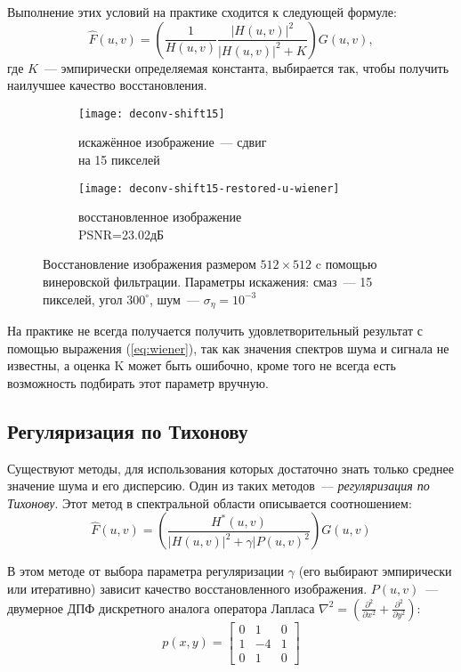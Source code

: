 Выполнение этих условий на практике сходится к следующей формуле:
\begin{equation}\label{eq:wiener}
\hat{F}(u,v)=\left(\frac{1}{H(u,v)}\frac{|H(u,v)|^2}{|H(u,v)|^2+K}\right)G(u,v),
\end{equation}
где $K$~--- эмпирически определяемая константа, выбирается так, чтобы получить наилучшее качество восстановления.

\begin{figure}[h!]
	\begin{subfigure}[b]{0.5\textwidth}
		\texttt{[image: deconv-shift15]}
		\caption{искажённое изображение~--- сдвиг \\на 15 пикселей}
		\label{fig:astroShift15u}
	\end{subfigure}%
	\begin{subfigure}[b]{0.5\textwidth}
		\texttt{[image: deconv-shift15-restored-u-wiener]}
		\caption{восстановленное изображение\\ PSNR=23.02дБ}
		\label{fig:astroWienerRestored}
	\end{subfigure}%
	\caption{Восстановление изображения размером $512\times 512$ c помощью винеровской фильтрации. Параметры искажения: смаз~--- 15 пикселей, угол $300^\circ$, шум~--- $\sigma_\eta=10^{-3}$}
\end{figure}

На практике не всегда получается получить удовлетворительный результат с помощью выражения (\ref{eq:wiener}), так как значения спектров шума и сигнала не известны, а оценка K может быть ошибочно, кроме того не всегда есть возможность подбирать этот параметр вручную.

\subsection{Регуляризация по Тихонову}
Существуют методы, для использования которых достаточно знать только среднее значение шума и его дисперсию. Один из таких методов~--- \textit{регуляризация по Тихонову}. Этот метод в спектральной области описывается соотношением\cite[стр.~418]{gonsalesDigital2012}:
\begin{equation}\label{eq:tikhonov}
\hat{F}(u,v) = \left(\frac{H^*(u,v)}{|H(u,v)|^2 + \gamma|P(u,v)^2}\right)G(u,v)
\end{equation}

В этом методе от выбора параметра регуляризации $\gamma$ (его выбирают эмпирически или итеративно) зависит качество восстановленного изображения. $P(u,v)$~--- двумерное ДПФ дискретного аналога оператора Лапласа $\nabla^2 = \left(\frac{\partial^2}{\partial x^2} + \frac{\partial^2}{\partial y^2}\right)$:
\begin{equation}
p(x,y) = \begin{bmatrix}
		0 & 1 & 0\\
		1 &-4 & 1\\
		0 & 1 & 0
	\end{bmatrix}
\end{equation}

